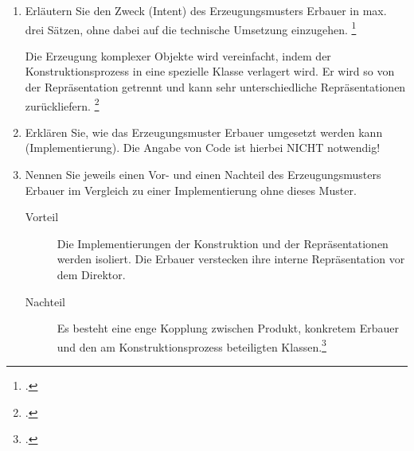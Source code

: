 \documentclass{bschlangaul-aufgabe}
\begin{document}

\begin{enumerate}


\item Erläutern Sie den Zweck (Intent) des Erzeugungsmusters Erbauer in
max. drei Sätzen, ohne dabei auf die technische Umsetzung einzugehen.
\footcite{examen:66116:2021:03}

\begin{bAntwort}
Die Erzeugung komplexer Objekte wird vereinfacht, indem der
Konstruktionsprozess in eine spezielle Klasse verlagert wird. Er wird so
von der Repräsentation getrennt und kann sehr unterschiedliche
Repräsentationen zurückliefern.
\footcite[Seite 29]{eilebrecht}
\end{bAntwort}


\item Erklären Sie, wie das Erzeugungsmuster Erbauer umgesetzt werden
kann (Implementierung). Die Angabe von Code ist hierbei NICHT notwendig!


\item Nennen Sie jeweils einen Vor- und einen Nachteil des
Erzeugungsmusters Erbauer im Vergleich zu einer Implementierung ohne
dieses Muster.

\begin{bAntwort}
\begin{description}
\item[Vorteil]

Die Implementierungen der Konstruktion und der Repräsentationen werden
isoliert. Die Erbauer verstecken ihre interne Repräsentation vor dem
Direktor.

\item[Nachteil]

Es besteht eine enge Kopplung zwischen Produkt, konkretem Erbauer und
den am Konstruktionsprozess beteiligten Klassen.\footcite{wiki:erbauer}
\end{description}
\end{bAntwort}

\end{enumerate}

\begin{bExkurs}
\bEntwurfsErbauerUml

\bEntwurfsErbauerAkteure
\end{bExkurs}
\end{document}
